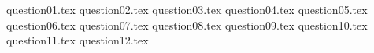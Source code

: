 \documentclass[french, 12pt]{article}
\newcommand{\<}[1]{\\\hspace*{-\indentationFormule}\makebox(0,0)[bl]{$#1$}\hspace*{\indentationFormule}}
\begin{document}

\pagebreak
{question01.tex}
\pagebreak
{question02.tex}
\pagebreak
{question03.tex}
\pagebreak
{question04.tex}
\pagebreak
{question05.tex}
\pagebreak
{question06.tex}
\pagebreak
{question07.tex}
\pagebreak
{question08.tex}
\pagebreak
{question09.tex}
\pagebreak
{question10.tex}
\pagebreak
{question11.tex}
\pagebreak
{question12.tex}
\end{document}
